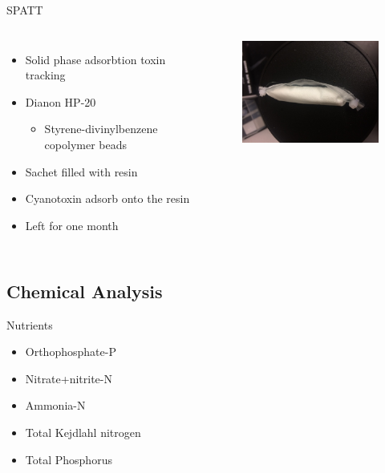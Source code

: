 \begin{frame}{SPATT}

\begin{columns}
	\begin{itemize}
		\item Solid phase adsorbtion toxin tracking 
		\item Dianon HP-20 
		\begin{itemize}
			\item Styrene-divinylbenzene copolymer beads
		\end{itemize} 
		
		\item Sachet filled with resin
		\item Cyanotoxin adsorb onto the resin
		\item Left for one month
	\end{itemize}

	\begin{figure}
		\includegraphics[width=2.3in,angle=-90]{bag.jpg}
	\end{figure}

\end{columns}

\end{frame}


\subsection{Chemical Analysis}

\begin{frame}{Nutrients}
	\begin{itemize}
		\item Orthophosphate-P 
		\item Nitrate+nitrite-N
		\item Ammonia-N 
		\item Total Kejdlahl nitrogen 
		\item Total Phosphorus
	\end{itemize}

	

\end{frame}

